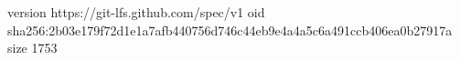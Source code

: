 version https://git-lfs.github.com/spec/v1
oid sha256:2b03e179f72d1e1a7afb440756d746c44eb9e4a4a5c6a491ccb406ea0b27917a
size 1753
